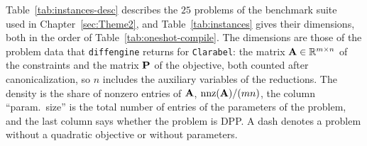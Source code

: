 
\setlength\LTcapwidth{\textwidth}

\label{app:bench}

Table~\ref{tab:instances-desc} describes the $25$ problems of the benchmark
suite~\cite{cvxpybenchmarks} used in Chapter~\ref{sec:Theme2}, and
Table~\ref{tab:instances} gives their dimensions, both in the order of
Table~\ref{tab:oneshot-compile}. The dimensions are those of the problem data that
\texttt{diffengine} returns for \texttt{Clarabel}: the matrix
$\mathbf{A} \in \mathbb{R}^{m \times n}$ of the constraints and the matrix $\mathbf{P}$ of the
objective, both counted after canonicalization, so $n$ includes the auxiliary variables of
the reductions. The density is the share of nonzero entries of $\mathbf{A}$,
$\mathrm{nnz}(\mathbf{A})/(mn)$, the column ``param.\ size'' is the total number of entries of
the parameters of the problem, and the last column says whether the problem is \ac{DPP}. A dash
denotes a problem without a quadratic objective or without parameters.

